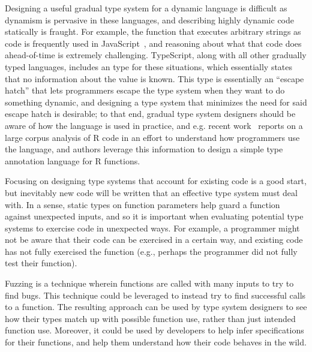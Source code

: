 \documentclass[sigplan,anonymous,review]{acmart}
\begin{document}
Designing a useful gradual type system for a dynamic language is difficult as dynamism is pervasive in these languages, and describing highly dynamic code statically is fraught.
For example, the  function that executes arbitrary strings as code is frequently used in JavaScript~\cite{richards2011eval}, and reasoning about what that code does ahead-of-time is extremely challenging.
TypeScript, along with all other gradually typed languages, includes an  type for these situations, which essentially states that no information about the value is known.
This  type is essentially an ``escape hatch'' that lets programmers escape the type system when they want to do something dynamic, and designing a type system that minimizes the need for said escape hatch is desirable; to that end, gradual type system designers should be aware of how the language is used in practice, and e.g. recent work~\cite{turcotte2020designing} reports on a large corpus analysis of R code in an effort to understand how programmers use the language, and authors leverage this information to design a simple type annotation language for R functions.

Focusing on designing type systems that account for existing code is a good start, but inevitably new code will be written that an effective type system must deal with.
In a sense, static types on function parameters help guard a function against unexpected inputs, and so it is important when evaluating potential type systems to exercise code in unexpected ways. 
For example, a programmer might not be aware that their code can be exercised in a certain way, and existing code has not fully exercised the function (e.g., perhaps the programmer did not fully test their function).

Fuzzing is a technique wherein functions are called with many inputs to try to find bugs.
This technique could be leveraged to instead try to find successful calls to a function.
The resulting approach can be used by type system designers to see how their types match up with possible function use, rather than just intended function use.
Moreover, it could be used by developers to help infer specifications for their functions, and help them understand how their code behaves in the wild.
\end{document}
